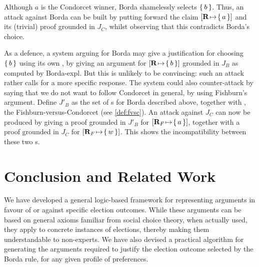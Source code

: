 \documentclass{comsoc2016}
\begin{document}
Although $a$ is the Condorcet winner, Borda shamelessly selects $\set{b}$. Thus, an attack against Borda can be built by putting forward the claim $\lato[\prof][\set{a}]$ and its (trivial) proof grounded in $J_C$, whilst observing that this contradicts Borda’s choice.

As a defence, a system arguing for Borda may give a justification for choosing $\set{b}$ using its own \laxiomatisation{}, by giving an argument for $\lato[\prof][\set{b}]$ grounded in $J_B$ as computed by Borda-expl. But this is unlikely to be convincing: such an attack rather calls for a more specific response. The system could also counter-attack by saying that we do not want to follow Condorcet in general, by using Fishburn’s argument. Define $J'_B$ as the set of \txtlaxiom{}s for Borda described above, together with , the Fishburn-versus-Condorcet \txtlaxiom{} (see \cref{def:fvsc}). An attack against $J_C$ can now be produced by giving a proof grounded in $J'_B$ for $\lato[\prof_F][\set{a}]$, together with a proof grounded in $J_C$ for $\lato[\prof_F][\set{w}]$. This shows the incompatibility between these two \laxiomatisation{}s.

\section{Conclusion and Related Work}\label{sec:conclusion}

We have developed a general logic-based framework for representing arguments in favour of or against specific election outcomes. While these arguments can be based on general axioms familiar from social choice theory, when actually used, they apply to concrete instances of elections, thereby making them understandable to non-experts. We have also devised a practical algorithm for generating the arguments required to justify the election outcome selected by the Borda rule, for any given profile of preferences.
\end{document}
